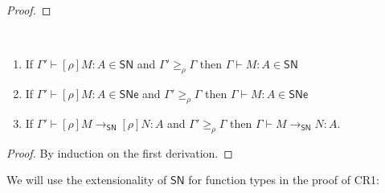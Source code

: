 \documentclass{article}
\newcommand{\ext}[1]{\geq_{#1}}
\newcommand{\SN}{\mathsf{SN}}
\newcommand{\SNe}{\mathsf{SNe}}
\newcommand{\CR}{\textsf{CR}}
\newcommand{\redSN}{\longrightarrow_\SN}
\begin{document}
\begin{proof}
\end{proof}

\begin{lemma}~\label{lm:anti-renameSN}
	\begin{enumerate}
		\item If $\Gamma' \vdash [\rho]M : A \in \SN$ and $\Gamma' \ext{\rho} \Gamma$ then $\Gamma \vdash M : A \in \SN$
		\item If $\Gamma' \vdash [\rho]M : A \in \SNe$ and $\Gamma' \ext{\rho} \Gamma$ then $\Gamma \vdash M : A \in \SNe$
		\item If $\Gamma' \vdash [\rho]M \redSN [\rho]N : A$ and $\Gamma' \ext{\rho} \Gamma$ then $\Gamma \vdash M \redSN N : A$.
	\end{enumerate}
\end{lemma}
\begin{proof}
	By induction on the first derivation.
\end{proof}


We will use the extensionality of $\SN$ for function types in the proof of \CR1:
\end{document}
